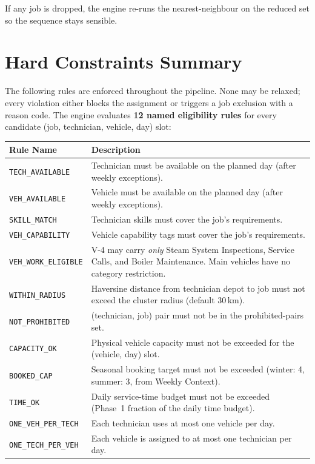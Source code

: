 \documentclass[12pt]{article}
\begin{document}
If any job is dropped, the engine re-runs the nearest-neighbour on the reduced set so the sequence stays sensible.

\section*{Hard Constraints Summary}

The following rules are enforced throughout the pipeline.  None may be relaxed; every violation either blocks the assignment or triggers a job exclusion with a reason code.
The engine evaluates \textbf{12 named eligibility rules} for every candidate (job, technician, vehicle, day) slot:

\medskip
{\small
\begin{longtable}{lp{9cm}}
\toprule
\textbf{Rule Name} & \textbf{Description} \\
\midrule
\texttt{TECH\_AVAILABLE}    & Technician must be available on the planned day (after weekly exceptions). \\
\texttt{VEH\_AVAILABLE}     & Vehicle must be available on the planned day (after weekly exceptions). \\
\texttt{SKILL\_MATCH}       & Technician skills must cover the job's requirements. \\
\texttt{VEH\_CAPABILITY}    & Vehicle capability tags must cover the job's requirements. \\
\texttt{VEH\_WORK\_ELIGIBLE}& V-4 may carry \emph{only} Steam System Inspections, Service Calls, and Boiler Maintenance. Main vehicles have no category restriction. \\
\texttt{WITHIN\_RADIUS}     & Haversine distance from technician depot to job must not exceed the cluster radius (default 30\,km). \\
\texttt{NOT\_PROHIBITED}    & (technician, job) pair must not be in the prohibited-pairs set. \\
\texttt{CAPACITY\_OK}       & Physical vehicle capacity must not be exceeded for the (vehicle, day) slot. \\
\texttt{BOOKED\_CAP}        & Seasonal booking target must not be exceeded (winter: 4, summer: 3, from Weekly Context). \\
\texttt{TIME\_OK}           & Daily service-time budget must not be exceeded (Phase~1 fraction of the daily time budget). \\
\texttt{ONE\_VEH\_PER\_TECH}& Each technician uses at most one vehicle per day. \\
\texttt{ONE\_TECH\_PER\_VEH}& Each vehicle is assigned to at most one technician per day. \\
\bottomrule
\end{longtable}
}
\end{document}
